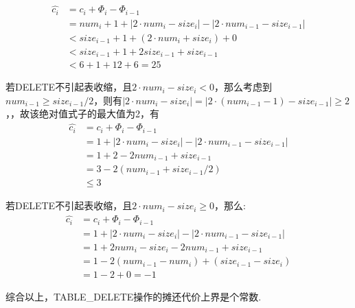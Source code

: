 \documentclass[UTF8]{ctexart}
\begin{document}
\begin{align*}
    \hat{c_i}&=c_i+\Phi_i-\Phi_{i-1}\\
    &=num_{i}+1+|2\cdot num_i - size_i|-|2\cdot num_{i-1} - size_{i-1}|\\
    &<size_{i-1}+1+(2\cdot num_i + size_i)+0\\
    &<size_{i-1}+1+2size_{i-1}+size_{i-1}\\
    &<6+1+12+6=25
\end{align*}\par 
若DELETE不引起表收缩，且$2\cdot num_i - size_i<0$，那么考虑到$num_{i-1}\geq size_{i-1}/2$，则有$|2\cdot num_i - size_i|=|2\cdot (num_{i-1}-1) - size_{i-1}|\geq 2$，，故该绝对值式子的最大值为2，有
\begin{align*}
    \hat{c_i}&=c_i+\Phi_i-\Phi_{i-1}\\
    &=1+|2\cdot num_i - size_i|-|2\cdot num_{i-1} - size_{i-1}|\\
    &=1+2-2num_{i-1}+size_{i-1}\\
    &=3-2(num_{i-1}+size_{i-1}/2)\\
    &\leq 3
\end{align*}\par 
若DELETE不引起表收缩，且$2\cdot num_i - size_i\geq 0$，那么:
\begin{align*}
    \hat{c_i}&=c_i+\Phi_i-\Phi_{i-1}\\
    &=1+|2\cdot num_i - size_i|-|2\cdot num_{i-1} - size_{i-1}|\\
    &=1+2num_i-size_i-2num_{i-1}+size_{i-1}\\
    &=1-2(num_{i-1}-num_i)+(size_{i-1}-size_i)\\
    &=1-2+0=-1
\end{align*}\par
综合以上，TABLE\_DELETE操作的摊还代价上界是个常数.
\end{document}
